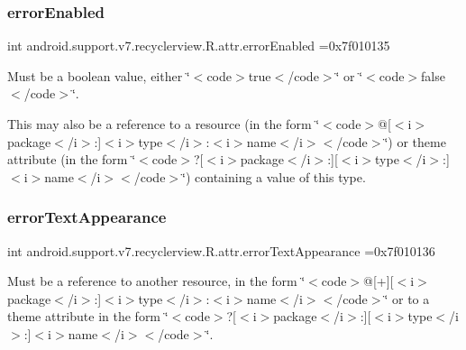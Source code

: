 \subsubsection{\texorpdfstring{error\+Enabled}{errorEnabled}}
{\footnotesize\ttfamily int android.\+support.\+v7.\+recyclerview.\+R.\+attr.\+error\+Enabled =0x7f010135\hspace{0.3cm}{\ttfamily [static]}}

Must be a boolean value, either \char`\"{}$<$code$>$true$<$/code$>$\char`\"{} or \char`\"{}$<$code$>$false$<$/code$>$\char`\"{}. 

This may also be a reference to a resource (in the form \char`\"{}$<$code$>$@\mbox{[}$<$i$>$package$<$/i$>$\+:\mbox{]}$<$i$>$type$<$/i$>$\+:$<$i$>$name$<$/i$>$$<$/code$>$\char`\"{}) or theme attribute (in the form \char`\"{}$<$code$>$?\mbox{[}$<$i$>$package$<$/i$>$\+:\mbox{]}\mbox{[}$<$i$>$type$<$/i$>$\+:\mbox{]}$<$i$>$name$<$/i$>$$<$/code$>$\char`\"{}) containing a value of this type. \mbox{\label{classandroid_1_1support_1_1v7_1_1recyclerview_1_1R_1_1attr_af4f2acb86357350cfe03ffde9fbf6ee6}} 
\subsubsection{\texorpdfstring{error\+Text\+Appearance}{errorTextAppearance}}
{\footnotesize\ttfamily int android.\+support.\+v7.\+recyclerview.\+R.\+attr.\+error\+Text\+Appearance =0x7f010136\hspace{0.3cm}{\ttfamily [static]}}

Must be a reference to another resource, in the form \char`\"{}$<$code$>$@\mbox{[}+\mbox{]}\mbox{[}$<$i$>$package$<$/i$>$\+:\mbox{]}$<$i$>$type$<$/i$>$\+:$<$i$>$name$<$/i$>$$<$/code$>$\char`\"{} or to a theme attribute in the form \char`\"{}$<$code$>$?\mbox{[}$<$i$>$package$<$/i$>$\+:\mbox{]}\mbox{[}$<$i$>$type$<$/i$>$\+:\mbox{]}$<$i$>$name$<$/i$>$$<$/code$>$\char`\"{}. \mbox{\label{classandroid_1_1support_1_1v7_1_1recyclerview_1_1R_1_1attr_a9ddcb299cd05d9654baacc4909328256}} 
